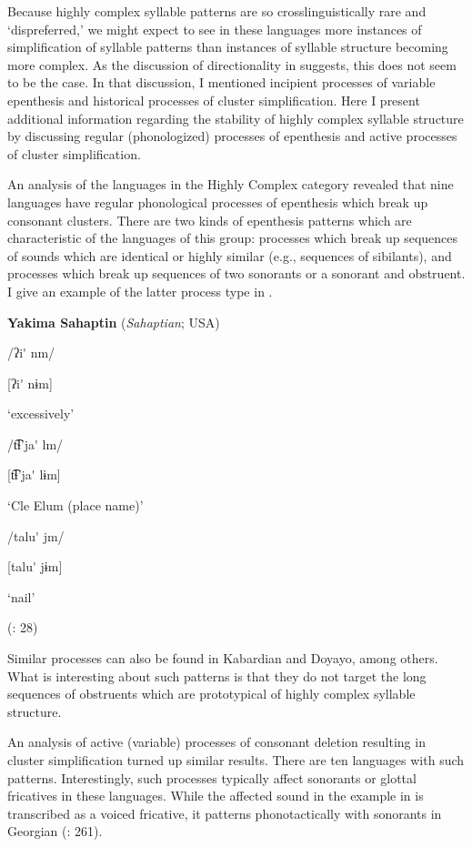   Because highly complex syllable patterns are so crosslinguistically rare and ‘dispreferred,’ we might expect to see in these languages more instances of simplification of syllable patterns than instances of syllable structure becoming more complex. As the discussion of directionality in  suggests, this does not seem to be the case. In that discussion, I mentioned incipient processes of variable epenthesis and historical processes of cluster simplification. Here I present additional information regarding the stability of highly complex syllable structure by discussing regular (phonologized) processes of epenthesis and active processes of cluster simplification.

  An analysis of the languages in the Highly Complex category revealed that nine languages have regular phonological processes of epenthesis which break up consonant clusters. There are two kinds of epenthesis patterns which are characteristic of the languages of this group: processes which break up sequences of sounds which are identical or highly similar (e.g., sequences of sibilants), and processes which break up sequences of two sonorants or a sonorant and obstruent. I give an example of the latter process type in .

\ea\label{ex:8.7}
  \textbf{Yakima Sahaptin} (\textit{Sahaptian}; USA)

\ea  /ʔi\'{} nm/

  [ʔi\'{} nɨm]

  ‘excessively’

\ex  /t͡ɬ’ja\'{} lm/

  [t͡ɬ’ja\'{} lɨm]

  ‘Cle Elum (place name)’

\ex  /talu\'{} jm/

  [talu\'{} jɨm]

  ‘nail’

(\citealt{HargusBeavert2006}: 28)
\z
\z

Similar processes can also be found in Kabardian and Doyayo, among others. What is interesting about such patterns is that they do not target the long sequences of obstruents which are prototypical of highly complex syllable structure.

  An analysis of active (variable) processes of consonant deletion resulting in cluster simplification turned up similar results. There are ten languages with such patterns. Interestingly, such processes typically affect sonorants or glottal fricatives in these languages. While the affected sound in the example in  is transcribed as a voiced fricative, it patterns phonotactically with sonorants in Georgian (\citealt{ShostedChikovani2006}: 261).

